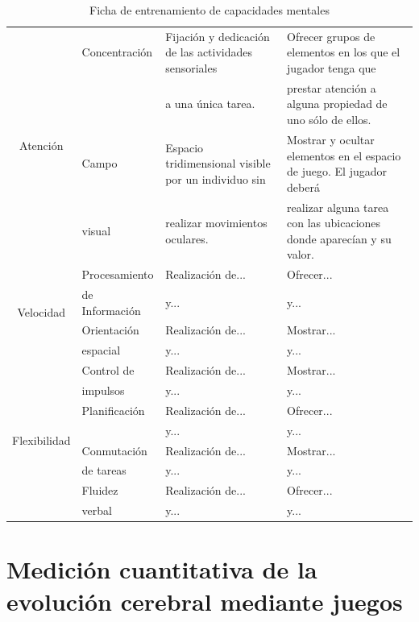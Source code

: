 \begin{table}[h]
\begin{small}
\begin{center}
\begin{sideways}
\begin{tabular}{|c|l|l|l|}
\multirow{4}{*}{\begin{sideways}Atención\end{sideways}} & Concentración & Fijación y dedicación de las actividades sensoriales & Ofrecer grupos de elementos en los que el jugador tenga que \\
 &  & a una única tarea. & prestar atención a alguna propiedad de uno sólo de ellos. \\
\cline{2-4}
 & Campo & Espacio tridimensional visible por un individuo sin & Mostrar y ocultar elementos en el espacio de juego. El jugador deberá \\
 & visual & realizar movimientos oculares. & realizar alguna tarea con las ubicaciones donde aparecían y su valor. \\
\hline

\multirow{4}{*}{\begin{sideways}Velocidad\end{sideways}} & Procesamiento & Realización de... &  Ofrecer... \\
 & de Información & y... & y... \\
\cline{2-4}
 & Orientación & Realización de... & Mostrar... \\
 & espacial & y... & y... \\
\hline
\multirow{8}{*}{\begin{sideways}Flexibilidad\end{sideways}} & Control de & Realización de... & Mostrar... \\
 & impulsos & y... & y... \\
\cline{2-4}
& Planificación & Realización de... & Ofrecer... \\
& & y... & y... \\
\cline{2-4}
& Conmutación & Realización de... & Mostrar... \\
& de tareas & y... & y... \\
\cline{2-4}
& Fluidez  & Realización de... & Ofrecer... \\
& verbal  & y... & y... \\
\hline
\end{tabular}
\end{sideways}
\end{center}
\end{small}
\caption{Ficha de entrenamiento de capacidades mentales}
\end{table}


\section{Medición cuantitativa de la evolución cerebral mediante juegos}

